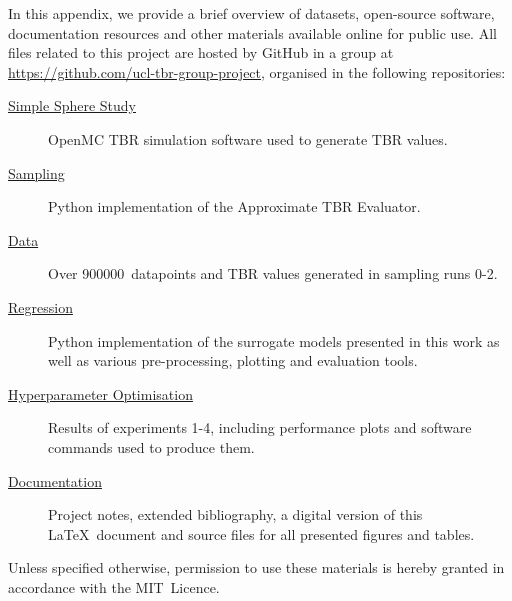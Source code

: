 In this appendix, we provide a brief overview of datasets, open-source
software, documentation resources and other materials available online for
public use. All files related to this project are hosted by GitHub in
a group at \url{https://github.com/ucl-tbr-group-project}, organised in the
following repositories:
\begin{description}
	\item[\href{https://github.com/ucl-tbr-group-project/simple-sphere-study}{Simple Sphere Study}]
		OpenMC TBR simulation software used to generate TBR values.
	\item[\href{https://github.com/ucl-tbr-group-project/sampling}{Sampling}]
		Python implementation of the Approximate TBR Evaluator.
	\item[\href{https://github.com/ucl-tbr-group-project/data}{Data}]
		Over \num{900000}~datapoints and TBR values generated in sampling runs 0-2.
	\item[\href{https://github.com/ucl-tbr-group-project/regression}{Regression}]
		Python implementation of the surrogate models presented in this work as
		well as various pre-processing, plotting and evaluation tools.
	\item[\href{https://github.com/ucl-tbr-group-project/hyperopt}{Hyperparameter Optimisation}]
		Results of experiments 1-4, including performance plots and software
		commands used to produce them.
	\item[\href{https://github.com/ucl-tbr-group-project/documentation}{Documentation}]
		Project notes, extended bibliography, a digital version of this
		\LaTeX\  document and source files for all presented figures and
		tables.
\end{description}

Unless specified otherwise, permission to use these materials is hereby granted
in accordance with the MIT~Licence.

